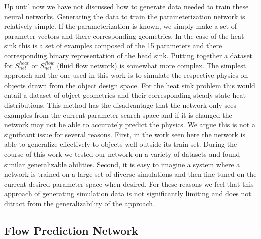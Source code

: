 \documentclass{article} %
\begin{document}
Up until now we have not discussed how to generate data needed to train these neural networks. Generating the data to train the parameterization network is relatively simple. If the parameterization is known, we simply make a set of parameter vectors and there corresponding geometries. In the case of the heat sink this is a set of examples composed of the 15 parameters and there corresponding binary representation of the head sink. Putting together a dataset for $S^{heat}_{net}$ or $S^{flow}_{net}$ (fluid flow network) is somewhat more complex. The simplest approach and the one used in this work is to simulate the respective physics on objects drawn from the object design space. For the heat sink problem this would entail a dataset of object geometries and their corresponding steady state heat distributions. This method has the disadvantage that the network only sees examples from the current parameter search space and if it is changed the network may not be able to accurately predict the physics. We argue this is not a significant issue for several reasons. First, in the work seen here the network is able to generalize effectively to objects well outside its train set. During the course of this work we tested our network on a variety of datasets and found similar generalizable abilities. Second, it is easy to imagine a system where a network is trained on a large set of diverse simulations and then fine tuned on the current desired parameter space when desired. For these reasons we feel that this approach of generating simulation data is not significantly limiting and does not ditract from the generalizability of the approach.

\subsection{Flow Prediction Network}
\end{document}
